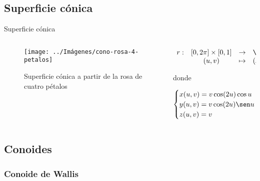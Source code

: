 \documentclass[10pt]{beamer}
\begin{document}
	\subsection{Superficie cónica}
	
	\begin{frame}{Superficie cónica}
		\begin{columns}[t] %
			\begin{column}{.50\textwidth}
				\begin{figure}
					\centering
					\texttt{[image: ../Imágenes/cono-rosa-4-petalos]}
					\caption{Superficie cónica a partir de la rosa de cuatro pétalos}
					\label{fig:cono-rosa-4-petalos}
				\end{figure}
			\end{column}%
			\hfill%
			\begin{column}{.50\textwidth}
				$$\begin{array}{rcll}
				r : & [0, 2\pi] \times [0,1] & \to & \R^3\\
				& (u,v) & \mapsto & (x,y,z)
				\end{array}$$
				
				donde 
				
				$$ \begin{cases}
				x(u,v) = v\cos(2u)\cos u \\
				y(u,v) = v\cos(2u) \sen u \\
				z(u,v) = v
				\end{cases} $$
			\end{column}%
		\end{columns}
	\end{frame}
		
	\subsection{Conoides}
	
	\subsubsection{Conoide de Wallis}
	
\end{document}
